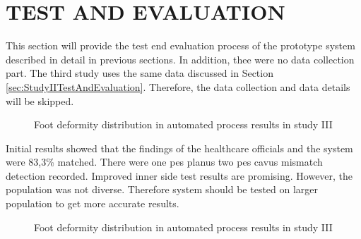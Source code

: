 \section{TEST AND EVALUATION}\label{sec:StudyIIITestAndEvaluation}

This section will provide the test end evaluation process of the prototype system described in detail in previous sections. In addition, thee were no data collection part. The third study uses the same data discussed in Section \ref{sec:StudyIITestAndEvaluation}. Therefore, the data collection and data details will be skipped.

\begin{figure}[htbp]
\centering
{}
\caption{Foot deformity distribution in automated process results in study III}
\label{fig:StudyIIIFootDeformityAutomatedProcessResults}
\end{figure} 

Initial results showed that the findings of the healthcare officials and the system were 83,3\% matched. There were one pes planus two pes cavus mismatch detection recorded. Improved inner side test results are promising. However, the population was not diverse. Therefore system should be tested on larger population to get more accurate results.

\begin{figure}[htbp]
\centering
{}
\caption{Foot deformity distribution in automated process results in study III}
\label{fig:StudyIIISlopeResults}
\end{figure} 

